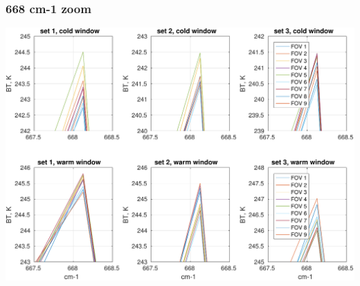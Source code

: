 \documentclass[11pt]{beamer}
\begin{document}
\begin{frame}
\frametitle{668 cm-1 zoom}
\begin{center}
  \includegraphics[scale=0.5]{figures/zoom_668.pdf}
\end{center}
\end{frame}
\end{document}
